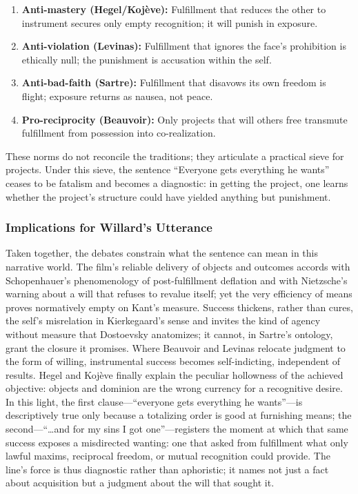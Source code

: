 \begin{enumerate}
\item \textbf{Anti-mastery (Hegel/Koj{\`e}ve):} Fulfillment that reduces the other to instrument
secures only empty recognition; it will punish in exposure.

\item \textbf{Anti-violation (Levinas):} Fulfillment that ignores the face's prohibition is
ethically null; the punishment is accusation within the self.

\item \textbf{Anti-bad-faith (Sartre):} Fulfillment that disavows its own freedom is flight;
exposure returns as nausea, not peace.

\item \textbf{Pro-reciprocity (Beauvoir):} Only projects that will others free transmute
fulfillment from possession into co-realization.
\end{enumerate}

These norms do not reconcile the traditions; they articulate a practical sieve for projects. Under
this sieve, the sentence ``Everyone gets everything he wants'' ceases to be fatalism and becomes
a diagnostic: in getting the project, one learns whether the project's structure could have yielded
anything but punishment.

\subsubsection*{Implications for Willard's Utterance}
\label{sssec:implications-for-willard-s-utterance}

Taken together, the debates constrain what the sentence can mean in this narrative world. The
film's reliable delivery of objects and outcomes accords with Schopenhauer's phenomenology of
post-fulfillment deflation and with Nietzsche's warning about a will that refuses to revalue
itself; yet the very efficiency of means proves normatively empty on Kant's measure. Success
thickens, rather than cures, the self's misrelation in Kierkegaard's sense and invites the kind of
agency without measure that Dostoevsky anatomizes; it cannot, in Sartre's ontology, grant the
closure it promises. Where Beauvoir and Levinas relocate judgment to the form of willing,
instrumental success becomes self-indicting, independent of results. Hegel and Koj{\`e}ve finally
explain the peculiar hollowness of the achieved objective: objects and dominion are the wrong
currency for a recognitive desire. In this light, the first clause---``everyone gets everything he
wants''---is descriptively true only because a totalizing order is good at furnishing means; the
second---``\ldots and for my sins I got one''---registers the moment at which that same success
exposes a misdirected wanting: one that asked from fulfillment what only lawful maxims, reciprocal
freedom, or mutual recognition could provide. The line's force is thus diagnostic rather than
aphoristic; it names not just a fact about acquisition but a judgment about the will that sought
it.

